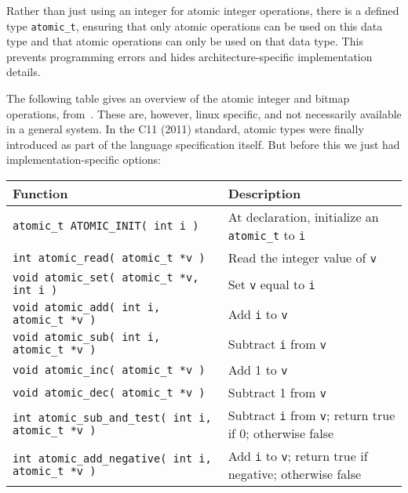 Rather than just using an integer for atomic integer operations, there is a defined type \texttt{atomic\_t}, ensuring that only atomic operations can be used on this data type and that atomic operations can only be used on that data type. This prevents programming errors and hides architecture-specific implementation details.

The following table gives an overview of the atomic integer and bitmap operations, from~\cite{lkd}. These are, however, linux specific, and not necessarily available in a general system. In the C11 (2011) standard, atomic types were finally introduced as part of the language specification itself. But before this we just had implementation-specific options:

\begin{center}
\begin{tabular}{l|l}
	\textbf{Function} & \textbf{Description}\\\hline

	\texttt{atomic\_t ATOMIC\_INIT( int i )} & At declaration, initialize an \texttt{atomic\_t} to \texttt{i}\\\hline

\texttt{int atomic\_read( atomic\_t *v )} &  Read the integer value of \texttt{v}\\\hline

\texttt{void atomic\_set( atomic\_t *v, int i )} & Set \texttt{v} equal to \texttt{i}\\\hline

\texttt{void atomic\_add( int i, atomic\_t *v )} & Add \texttt{i} to \texttt{v}\\\hline

\texttt{void atomic\_sub( int i, atomic\_t *v )} & Subtract \texttt{i} from \texttt{v}\\\hline

\texttt{void atomic\_inc( atomic\_t *v )} & Add 1 to \texttt{v}\\\hline

\texttt{void atomic\_dec( atomic\_t *v )} & Subtract 1 from \texttt{v}\\\hline

\texttt{int atomic\_sub\_and\_test( int i, atomic\_t *v )} & Subtract \texttt{i} from \texttt{v}; return true if 0; otherwise false\\\hline

\texttt{int atomic\_add\_negative( int i, atomic\_t *v )} & Add \texttt{i} to \texttt{v}; return true if negative; otherwise false\\\hline


\end{tabular}
\end{center}
